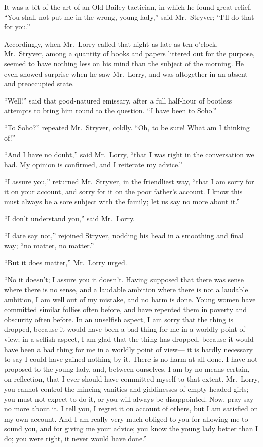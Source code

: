 It was a bit of the art of an Old Bailey tactician, in which he
found great relief.  ``You shall not put me in the wrong, young lady,''
said Mr.\ Stryver; ``I'll do that for you.''

Accordingly, when Mr.\ Lorry called that night as late as ten o'clock,
Mr.\ Stryver, among a quantity of books and papers littered out for
the purpose, seemed to have nothing less on his mind than the subject
of the morning.  He even showed surprise when he saw Mr.\ Lorry, and
was altogether in an absent and preoccupied state.

``Well!'' said that good-natured emissary, after a full half-hour of
bootless attempts to bring him round to the question.  ``I have
been to Soho.''

``To Soho?'' repeated Mr.\ Stryver, coldly.  ``Oh, to be sure!
What am I thinking of!''

``And I have no doubt,'' said Mr.\ Lorry, ``that I was right in the
conversation we had.  My opinion is confirmed, and I reiterate my advice.''

``I assure you,'' returned Mr.\ Stryver, in the friendliest way, ``that I
am sorry for it on your account, and sorry for it on the poor father's
account.  I know this must always be a sore subject with the family;
let us say no more about it.''

``I don't understand you,'' said Mr.\ Lorry.

``I dare say not,'' rejoined Stryver, nodding his head in a smoothing
and final way; ``no matter, no matter.''

``But it does matter,'' Mr.\ Lorry urged.

``No it doesn't; I assure you it doesn't.  Having supposed that there
was sense where there is no sense, and a laudable ambition where there
is not a laudable ambition, I am well out of my mistake, and no harm
is done.  Young women have committed similar follies often before,
and have repented them in poverty and obscurity often before.  In an
unselfish aspect, I am sorry that the thing is dropped, because it
would have been a bad thing for me in a worldly point of view;
in a selfish aspect, I am glad that the thing has dropped, because it
would have been a bad thing for me in a worldly point of view---%
it is hardly necessary to say I could have gained nothing by it.
There is no harm at all done.  I have not proposed to the young lady,
and, between ourselves, I am by no means certain, on reflection,
that I ever should have committed myself to that extent.  Mr.\ Lorry,
you cannot control the mincing vanities and giddinesses of
empty-headed girls; you must not expect to do it, or you will always
be disappointed.  Now, pray say no more about it.  I tell you,
I regret it on account of others, but I am satisfied on my own account.
And I am really very much obliged to you for allowing me to sound you,
and for giving me your advice; you know the young lady better
than I do; you were right, it never would have done.''

